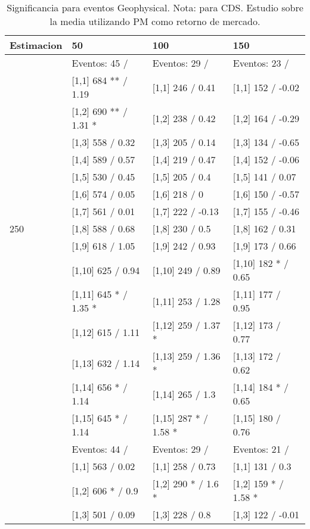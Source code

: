 \begin{table}

\caption{Significancia para eventos Geophysical. Nota: para CDS. Estudio sobre la media utilizando PM como retorno de mercado.}
\centering
\begin{tabular}[t]{llll}
\toprule
Estimacion & 50 & 100 & 150\\
\midrule
 & Eventos:  45 / & Eventos:  29 / & Eventos:  23 /\\
 & {}[1,1] 684 ** / 1.19 & {}[1,1] 246  / 0.41 & {}[1,1] 152  / -0.02\\
 & {}[1,2] 690 ** / 1.31 * & {}[1,2] 238  / 0.42 & {}[1,2] 164  / -0.29\\
 & {}[1,3] 558  / 0.32 & {}[1,3] 205  / 0.14 & {}[1,3] 134  / -0.65\\
 & {}[1,4] 589  / 0.57 & {}[1,4] 219  / 0.47 & {}[1,4] 152  / -0.06\\
\addlinespace
 & {}[1,5] 530  / 0.45 & {}[1,5] 205  / 0.4 & {}[1,5] 141  / 0.07\\
 & {}[1,6] 574  / 0.05 & {}[1,6] 218  / 0 & {}[1,6] 150  / -0.57\\
 & {}[1,7] 561  / 0.01 & {}[1,7] 222  / -0.13 & {}[1,7] 155  / -0.46\\
250 & {}[1,8] 588  / 0.68 & {}[1,8] 230  / 0.5 & {}[1,8] 162  / 0.31\\
 & {}[1,9] 618  / 1.05 & {}[1,9] 242  / 0.93 & {}[1,9] 173  / 0.66\\
\addlinespace
 & {}[1,10] 625  / 0.94 & {}[1,10] 249  / 0.89 & {}[1,10] 182 * / 0.65\\
 & {}[1,11] 645 * / 1.35 * & {}[1,11] 253  / 1.28 & {}[1,11] 177  / 0.95\\
 & {}[1,12] 615  / 1.11 & {}[1,12] 259  / 1.37 * & {}[1,12] 173  / 0.77\\
 & {}[1,13] 632  / 1.14 & {}[1,13] 259  / 1.36 * & {}[1,13] 172  / 0.62\\
 & {}[1,14] 656 * / 1.14 & {}[1,14] 265  / 1.3 & {}[1,14] 184 * / 0.65\\
\addlinespace
 & {}[1,15] 645 * / 1.14 & {}[1,15] 287 * / 1.58 * & {}[1,15] 180  / 0.76\\
 & Eventos:  44 / & Eventos:  29 / & Eventos:  21 /\\
 & {}[1,1] 563  / 0.02 & {}[1,1] 258  / 0.73 & {}[1,1] 131  / 0.3\\
 & {}[1,2] 606 * / 0.9 & {}[1,2] 290 * / 1.6 * & {}[1,2] 159 * / 1.58 *\\
 & {}[1,3] 501  / 0.09 & {}[1,3] 228  / 0.8 & {}[1,3] 122  / -0.01\\

\end{tabular}
\end{table}

